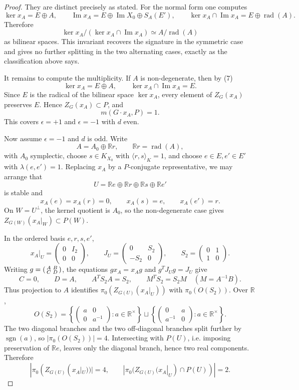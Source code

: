 \documentclass[10pt]{article}
\newcommand{\K}{K_{X_0}}
\newcommand{\rad}{\operatorname{rad}}
\newcommand{\im}{\operatorname{Im}}
\begin{document}
\begin{proof}
They are distinct precisely as stated.  For the normal form one computes
\[
\ker x_A=E\oplus A,\qquad
\im x_A=E\oplus\im X_0\oplus S_A(E'),\qquad
\ker x_A\cap\im x_A=E\oplus\rad(A).
\tag{7}
\]
Therefore
\[
\ker x_A/(\ker x_A\cap\im x_A)\simeq A/\rad(A)
\tag{8}
\]
as bilinear spaces.  This invariant recovers the signature in the symmetric
case and gives no further splitting in the two alternating cases, exactly as
the classification above says.

It remains to compute the multiplicity.  If \(A\) is non-degenerate, then by
(7)
\[
\ker x_A=E\oplus A,\qquad \ker x_A\cap\im x_A=E.
\]
Since \(E\) is the radical of the bilinear space \(\ker x_A\), every element of
\(Z_G(x_A)\) preserves \(E\).  Hence \(Z_G(x_A)\subset P\), and
\[
m(G\cdot x_A,P)=1.
\]
This covers \(\epsilon=+1\) and \(\epsilon=-1\) with \(d\) even.

Now assume \(\epsilon=-1\) and \(d\) is odd.  Write
\[
A=A_0\oplus \mathbb R r,\qquad \mathbb R r=\rad(A),
\]
with \(A_0\) symplectic, choose \(s\in\K\) with
\(\langle r,s\rangle_K=1\), and choose \(e\in E,e'\in E'\) with
\(\lambda(e,e')=1\).  Replacing \(x_A\) by a \(P\)-conjugate representative, we
may arrange that
\[
U=\mathbb Re\oplus\mathbb Rr\oplus\mathbb Rs\oplus\mathbb Re'
\]
is stable and
\[
x_A(e)=x_A(r)=0,\qquad x_A(s)=e,\qquad x_A(e')=r.
\tag{9}
\]
On \(W=U^\perp\), the kernel quotient is \(A_0\), so the non-degenerate case
gives \(Z_{G(W)}(x_A|_W)\subset P(W)\).

In the ordered basis \(e,r,s,e'\),
\[
x_A|_U=
\begin{pmatrix}0&I_2\\0&0\end{pmatrix},\qquad
J_U=
\begin{pmatrix}0&S_2\\-S_2&0\end{pmatrix},\qquad
S_2=\begin{pmatrix}0&1\\1&0\end{pmatrix}.
\]
Writing \(g=\begin{psmallmatrix}A&B\\ C&D\end{psmallmatrix}\), the equations
\(gx_A=x_Ag\) and \(g^TJ_Ug=J_U\) give
\[
C=0,\qquad D=A,\qquad A^TS_2A=S_2,\qquad
M^TS_2=S_2M\quad(M=A^{-1}B).
\]
Thus projection to \(A\) identifies \(\pi_0(Z_{G(U)}(x_A|_U))\) with
\(\pi_0(O(S_2))\).  Over \(\mathbb R\),
\[
O(S_2)=
\left\{
\begin{pmatrix}a&0\\0&a^{-1}\end{pmatrix}:a\in\mathbb R^\times
\right\}
\sqcup
\left\{
\begin{pmatrix}0&a\\a^{-1}&0\end{pmatrix}:a\in\mathbb R^\times
\right\}.
\]
The two diagonal branches and the two off-diagonal branches split further by
\(\operatorname{sgn}(a)\), so \(|\pi_0(O(S_2))|=4\).  Intersecting with
\(P(U)\), i.e. imposing preservation of \(\mathbb Re\), leaves only the
diagonal branch, hence two real components.  Therefore
\[
|\pi_0(Z_{G(U)}(x_A|_U))|=4,\qquad
|\pi_0(Z_{G(U)}(x_A|_U)\cap P(U))|=2.
\tag{10}
\]


\end{proof}
\end{document}
